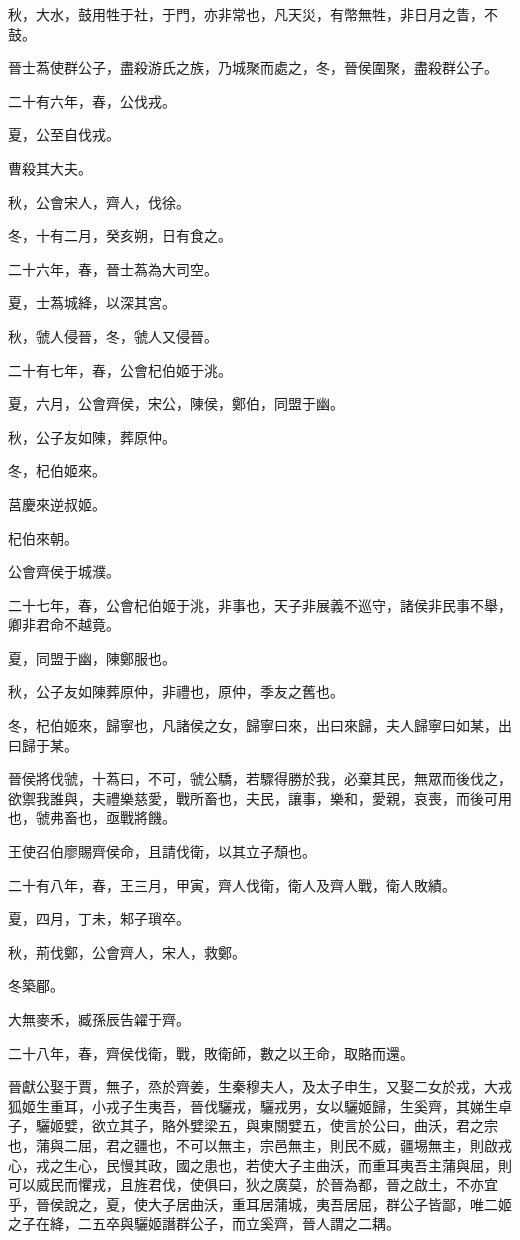 \begin{pinyinscope}
秋，大水，鼓用牲于社，于門，亦非常也，凡天災，有幣無牲，非日月之眚，不鼓。

晉士蒍使群公子，盡殺游氏之族，乃城聚而處之，冬，晉侯圍聚，盡殺群公子。

二十有六年，春，公伐戎。

夏，公至自伐戎。

曹殺其大夫。

秋，公會宋人，齊人，伐徐。

冬，十有二月，癸亥朔，日有食之。

二十六年，春，晉士蒍為大司空。

夏，士蒍城絳，以深其宮。

秋，虢人侵晉，冬，虢人又侵晉。

二十有七年，春，公會杞伯姬于洮。

夏，六月，公會齊侯，宋公，陳侯，鄭伯，同盟于幽。

秋，公子友如陳，葬原仲。

冬，杞伯姬來。

莒慶來逆叔姬。

杞伯來朝。

公會齊侯于城濮。

二十七年，春，公會杞伯姬于洮，非事也，天子非展義不巡守，諸侯非民事不舉，卿非君命不越竟。

夏，同盟于幽，陳鄭服也。

秋，公子友如陳葬原仲，非禮也，原仲，季友之舊也。

冬，杞伯姬來，歸寧也，凡諸侯之女，歸寧曰來，出曰來歸，夫人歸寧曰如某，出曰歸于某。

晉侯將伐虢，十蒍曰，不可，虢公驕，若驟得勝於我，必棄其民，無眾而後伐之，欲禦我誰與，夫禮樂慈愛，戰所畜也，夫民，讓事，樂和，愛親，哀喪，而後可用也，虢弗畜也，亟戰將饑。

王使召伯廖賜齊侯命，且請伐衛，以其立子頹也。

二十有八年，春，王三月，甲寅，齊人伐衛，衛人及齊人戰，衛人敗績。

夏，四月，丁未，邾子瑣卒。

秋，荊伐鄭，公會齊人，宋人，救鄭。

冬築郿。

大無麥禾，臧孫辰告糴于齊。

二十八年，春，齊侯伐衛，戰，敗衛師，數之以王命，取賂而還。

晉獻公娶于賈，無子，烝於齊姜，生秦穆夫人，及太子申生，又娶二女於戎，大戎狐姬生重耳，小戎子生夷吾，晉伐驪戎，驪戎男，女以驪姬歸，生奚齊，其娣生卓子，驪姬嬖，欲立其子，賂外嬖梁五，與東關嬖五，使言於公曰，曲沃，君之宗也，蒲與二屈，君之疆也，不可以無主，宗邑無主，則民不威，疆埸無主，則啟戎心，戎之生心，民慢其政，國之患也，若使大子主曲沃，而重耳夷吾主蒲與屈，則可以威民而懼戎，且旌君伐，使俱曰，狄之廣莫，於晉為都，晉之啟土，不亦宜乎，晉侯說之，夏，使大子居曲沃，重耳居蒲城，夷吾居屈，群公子皆鄙，唯二姬之子在絳，二五卒與驪姬譖群公子，而立奚齊，晉人謂之二耦。


\end{pinyinscope}
